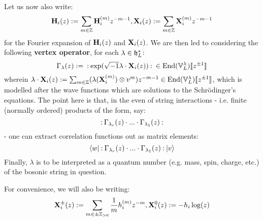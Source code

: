 \begin{remark}
                Let us now also write:
                    $$\mathbf{H}_i(z) := \sum_{m \in \mathbb{Z}} \mathbf{H}_i^{(m)} z^{-m - 1}, \mathbf{X}_i(z) := \sum_{m \in \mathbb{Z}} \mathbf{X}_i^{(m)} z^{-m - 1}$$
                for the Fourier expansion of $\mathbf{H}_i(z)$ and $\mathbf{X}_i(z)$. We are then led to considering the following \textbf{vertex operator}, for each $\lambda \in \mathfrak{h}_L^*$:
                    $$\Gamma_{\lambda}(z) := \: \mathbf{:} \: { \exp( \sqrt{-1} \lambda \cdot \mathbf{X}_i(z) ) }  \: \mathbf{:} \: \in \mathrm{End}(\mathbb{V}_L^{\lambda})[\![z^{\pm 1}]\!]$$
                wherein $\lambda \cdot \bfX_i(z) := \sum_{m \in \Z} (\lambda(\bfX_i^{(m)}) \tensor v^m) z^{-m - 1} \in \End(\V_L^{\lambda})[\![z^{\pm 1}]\!]$, which is modelled after the wave functions which are solutions to the Schr\"odinger's equations. The point here is that, in the even of string interactions - i.e. finite (normally ordered) products of the form, say:
                    $$\: \mathbf{:} \: { \Gamma_{\lambda_r}(z) \cdot ... \cdot \Gamma_{\lambda_1}(z) }  \: \mathbf{:} \:$$
                - one can extract correlation functions out as matrix elements:
                    $$\langle {w} \rvert \: \mathbf{:} \: { \Gamma_{\lambda_r}(z) \cdot ... \cdot \Gamma_{\lambda_1}(z) }  \: \mathbf{:} \: \lvert {v} \rangle$$
                Finally, $\lambda$ is to be interpreted as a quantum number (e.g. mass, spin, charge, etc.) of the bosonic string in question.
            \end{remark}

            \begin{convention}
                For convenience, we will also be writing:
                    $$\mathbf{X}_i^{\pm}(z) := \sum_{m \in \pm \mathbb{Z}_{> 0}} \frac1m h_i^{(m)} z^{-m}, \mathbf{X}_i^0(z) := -h_i \log(z)$$
            \end{convention}
            
